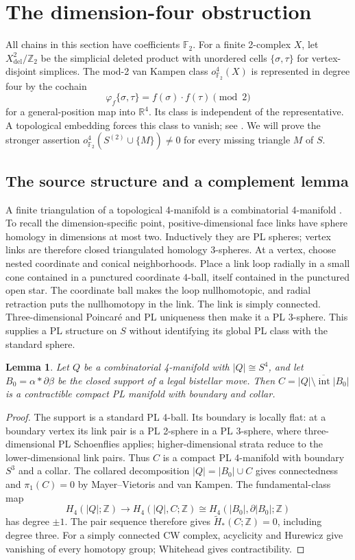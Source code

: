 \documentclass[11pt]{article}
\newtheorem{lemma}[theorem]{Lemma}
\theoremstyle{remark}
\newcommand{\F}{\mathbb F}
\newcommand{\Z}{\mathbb Z}
\newcommand{\R}{\mathbb R}
\newcommand{\interior}{\operatorname{int}}
\newcommand{\del}{\mathrm{del}}
\newcommand{\vk}{o^4_{\F_2}}
\begin{document}
\section{The dimension-four obstruction}

All chains in this section have coefficients $\F_2$. For a finite
2-complex $X$, let $X^2_{\del}/\Z_2$ be the simplicial deleted product
with unordered cells $\{\sigma,\tau\}$ for vertex-disjoint simplices.
The mod-2 van Kampen class $\vk(X)$ is represented in degree four by
the cochain
\[
\varphi_f\{\sigma,\tau\}=f(\sigma)\cdot f(\tau)\pmod2
\]
for a general-position map into $\R^4$. Its class is independent of
the representative. A topological embedding forces this class to
vanish; see \cite[Section~2]{NW}. We will prove the stronger assertion
$\vk(S^{(2)}\cup\{M\})\ne0$ for every missing triangle $M$ of $S$.

\subsection{The source structure and a complement lemma}

A finite triangulation of a topological 4-manifold is a combinatorial
4-manifold \cite[p.~797]{DFL}. To recall the dimension-specific point,
positive-dimensional face links have sphere homology in dimensions at
most two. Inductively they are PL spheres; vertex links are therefore
closed triangulated homology 3-spheres. At a vertex, choose nested
coordinate and conical neighborhoods. Place a link loop radially in a
small cone contained in a punctured coordinate 4-ball, itself contained
in the punctured open star. The coordinate ball makes the loop
nullhomotopic, and radial retraction puts the nullhomotopy in the link.
The link is simply connected. Three-dimensional Poincar\'e and PL
uniqueness then make it a PL 3-sphere. This supplies a PL structure on
$S$ without identifying its global PL class with the standard sphere.

\begin{lemma}\label{lem:complement}
Let $Q$ be a combinatorial 4-manifold with $|Q|\cong S^4$, and let
$B_0=\alpha*\partial\beta$ be the closed support of a legal bistellar
move. Then $C=\overline{|Q|\setminus\interior|B_0|}$ is a contractible
compact PL manifold with boundary and collar.
\end{lemma}

\begin{proof}
The support is a standard PL 4-ball. Its boundary is locally flat:
at a boundary vertex its link pair is a PL 2-sphere in a PL 3-sphere,
where three-dimensional PL Schoenflies applies; higher-dimensional
strata reduce to the lower-dimensional link pairs. Thus $C$ is a
compact PL 4-manifold with boundary $S^3$ and a collar.
The collared decomposition $|Q|=|B_0|\cup C$ gives connectedness and
$\pi_1(C)=0$ by Mayer--Vietoris and van Kampen. The fundamental-class
map
\[
H_4(|Q|;\Z)\longrightarrow H_4(|Q|,C;\Z)
 \cong H_4(|B_0|,\partial|B_0|;\Z)
\]
has degree $\pm1$. The pair sequence therefore gives
$\widetilde H_*(C;\Z)=0$, including degree three. For a simply connected
CW complex, acyclicity and Hurewicz give vanishing of every homotopy
group; Whitehead gives contractibility.
\end{proof}
\end{document}
